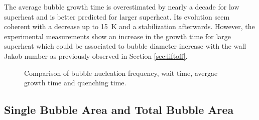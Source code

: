 \npar

The average bubble growth time is overestimated by nearly a decade for low superheat and is better predicted for larger superheat. Its evolution seem coherent with a decrease up to 15\ K and a stabilization afterwards. However, the experimental measurements show an increase in the growth time for large superheat which could be associated to bubble diameter increase with the wall Jakob number as previously observed in Section \ref{sec:liftoff}.



\begin{figure}[!h]
\caption{Comparison of bubble nucleation frequency, wait time, avergae growth time and quenching time.}
\label{fig:fullkoss_times}
\end{figure}


\subsection{Single Bubble Area and Total Bubble Area}

